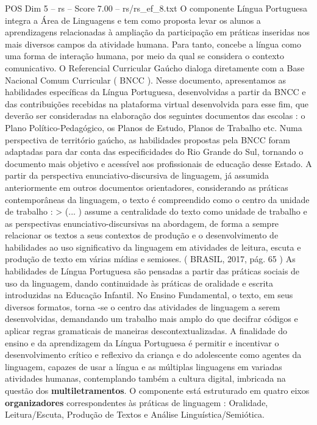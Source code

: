 \begin{textsample}{POS Dim 5 – rs – Score 7.00 – rs/rs\_ef\_8.txt}  \label{ex:f5_pos_262}
O componente Língua Portuguesa integra a Área de Linguagens e tem como proposta levar os alunos a aprendizagens relacionadas à ampliação da participação em práticas inseridas nos mais diversos campos da atividade humana.
Para tanto, concebe a língua como uma forma de interação humana, por meio da qual se considera o contexto comunicativo.
O Referencial Curricular Gaúcho dialoga diretamente com a Base Nacional Comum Curricular ( BNCC ).
Nesse documento, apresentamos as habilidades específicas da Língua Portuguesa, desenvolvidas a partir da BNCC e das contribuições recebidas na plataforma virtual desenvolvida para esse fim, que deverão ser consideradas na elaboração dos seguintes documentos das escolas : o Plano Político-Pedagógico, os Planos de Estudo, Planos de Trabalho etc.
Numa perspectiva de território gaúcho, as habilidades propostas pela BNCC foram adaptadas para dar conta das especificidades do Rio Grande do Sul, tornando o documento mais objetivo e acessível aos profissionais de educação desse Estado.
A partir da perspectiva enunciativo-discursiva de linguagem, já assumida anteriormente em outros documentos orientadores, considerando as práticas contemporâneas da linguagem, o texto é compreendido como o centro da unidade de trabalho : > (... ) assume a centralidade do texto como unidade de trabalho e as perspectivas enunciativo-discursivas na abordagem, de forma a sempre relacionar os textos a seus contextos de produção e o desenvolvimento de habilidades ao uso significativo da linguagem em atividades de leitura, escuta e produção de texto em várias mídias e semioses. ( BRASIL, 2017, pág. 65 ) As habilidades de Língua Portuguesa são pensadas a partir das práticas sociais de uso da linguagem, dando continuidade às práticas de oralidade e escrita introduzidas na Educação Infantil.
No Ensino Fundamental, o texto, em seus diversos formatos, torna -se o centro das atividades de linguagem a serem desenvolvidas, demandando um trabalho mais amplo do que decifrar códigos e aplicar regras gramaticais de maneiras descontextualizadas.
A finalidade do ensino e da aprendizagem da Língua Portuguesa é permitir e incentivar o desenvolvimento crítico e reflexivo da criança e do adolescente como agentes da linguagem, capazes de usar a língua e as múltiplas linguagens em variadas atividades humanas, contemplando também a cultura digital, imbricada na questão dos \textbf{multiletramentos}.
O componente está estruturado em quatro eixos \textbf{organizadores} correspondentes às práticas de linguagem : Oralidade, Leitura/Escuta, Produção de Textos e Análise Linguística/Semiótica.

\end{textsample}
